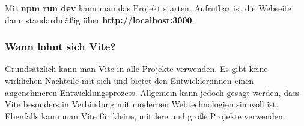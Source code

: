 Mit \textbf{npm run dev} kann man das Projekt starten. Aufrufbar ist die Webseite dann standardmäßig über \textbf{http://localhost:3000}.

\subsubsection{Wann lohnt sich Vite?}
Grundsätzlich kann man Vite in alle Projekte verwenden. Es gibt keine wirklichen Nachteile mit sich und bietet den Entwickler:innen einen angenehmeren Entwicklungsprozess. Allgemein kann jedoch gesagt werden, dass Vite besonders in Verbindung mit modernen Webtechnologien sinnvoll ist. Ebenfalls kann man Vite für kleine, mittlere und große Projekte verwenden.

\cite{frontend_vite}